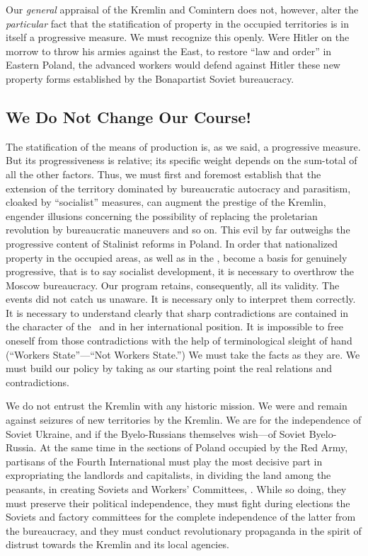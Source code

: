 Our \emph{general} appraisal of the Kremlin and Comintern does not, however, alter the \emph{particular} fact that the statification of property in the occupied territories is in itself a progressive measure. We must recognize this openly. Were Hitler on the morrow to throw his armies against the East, to restore “law and order” in Eastern Poland, the advanced workers would defend against Hitler these new property forms established by the Bonapartist Soviet bureaucracy.

\subsection*{We Do Not Change Our Course!}

The statification of the means of production is, as we said, a progressive measure. But its progressiveness is relative; its specific weight depends on the sum-total of all the other factors. Thus, we must first and foremost establish that the extension of the territory dominated by bureaucratic autocracy and parasitism, cloaked by “socialist” measures, can augment the prestige of the Kremlin, engender illusions concerning the possibility of replacing the proletarian revolution by bureaucratic maneuvers and so on. This evil by far outweighs the progressive content of Stalinist reforms in Poland. In order that nationalized property in the occupied areas, as well as in the \USSR, become a basis for genuinely progressive, that is to say socialist development, it is necessary to overthrow the Moscow bureaucracy. Our program retains, consequently, all its validity. The events did not catch us unaware. It is necessary only to interpret them correctly. It is necessary to understand clearly that sharp contradictions are contained in the character of the \USSR\ and in her international position. It is impossible to free oneself from those contradictions with the help of terminological sleight of hand (“Workers State”---“Not Workers State.”) We must take the facts as they are. We must build our policy by taking as our starting point the real relations and contradictions.

We do not entrust the Kremlin with any historic mission. We were and remain against seizures of new territories by the Kremlin. We are for the independence of Soviet Ukraine, and if the Byelo-Russians themselves wish---of Soviet Byelo-Russia. At the same time in the sections of Poland occupied by the Red Army, partisans of the Fourth International must play the most decisive part in expropriating the landlords and capitalists, in dividing the land among the peasants, in creating Soviets and Workers’ Committees, \etc. While so doing, they must preserve their political independence, they must fight during elections the Soviets and factory committees for the complete independence of the latter from the bureaucracy, and they must conduct revolutionary propaganda in the spirit of distrust towards the Kremlin and its local agencies.

